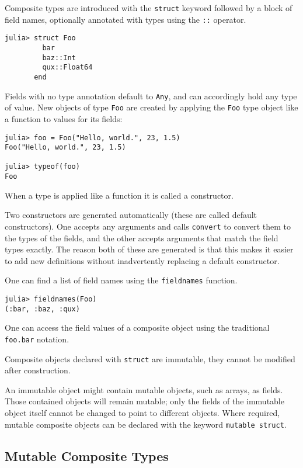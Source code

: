 \documentclass[
]{article}
\begin{document}
Composite types are introduced with the \texttt{struct} keyword followed
by a block of field names, optionally annotated with types using the
\texttt{::} operator.

\begin{verbatim}
julia> struct Foo
         bar
         baz::Int
         qux::Float64
       end
\end{verbatim}

Fields with no type annotation default to \texttt{Any}, and can
accordingly hold any type of value. New objects of type \texttt{Foo} are
created by applying the \texttt{Foo} type object like a function to
values for its fields:

\begin{verbatim}
julia> foo = Foo("Hello, world.", 23, 1.5)
Foo("Hello, world.", 23, 1.5)

julia> typeof(foo)
Foo
\end{verbatim}

When a type is applied like a function it is called a constructor.

Two constructors are generated automatically (these are called default
constructors). One accepts any arguments and calls \texttt{convert} to
convert them to the types of the fields, and the other accepts arguments
that match the field types exactly. The reason both of these are
generated is that this makes it easier to add new definitions without
inadvertently replacing a default constructor.

One can find a list of field names using the \texttt{fieldnames}
function.

\begin{verbatim}
julia> fieldnames(Foo)
(:bar, :baz, :qux)
\end{verbatim}

One can access the field values of a composite object using the
traditional \texttt{foo.bar} notation.

Composite objects declared with \texttt{struct} are immutable, they
cannot be modified after construction.

An immutable object might contain mutable objects, such as arrays, as
fields. Those contained objects will remain mutable; only the fields of
the immutable object itself cannot be changed to point to different
objects. Where required, mutable composite objects can be declared with
the keyword \texttt{mutable\ struct}.

\hypertarget{mutable-composite-types}{%
\subsection{Mutable Composite Types}\label{mutable-composite-types}}
\end{document}
